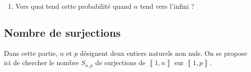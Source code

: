 \documentclass[a4paper,french,bookmarks]{article}
\begin{document}
\begin{enumerate}
\begin{enumerate}
        \item Vers quoi tend cette probabilité quand $n$ tend vers l'infini ?
        
     \end{enumerate}
\end{enumerate}

\subsection{Nombre de surjections}

Dans cette partie, $n$ et $p$ désignent deux entiers naturels non nuls. On se propose ici de chercher le nombre $S_{n,p}$ de surjections de $\left\llbracket 1, n\right\rrbracket$ sur $\left\llbracket 1, p\right\rrbracket$.
\end{document}
